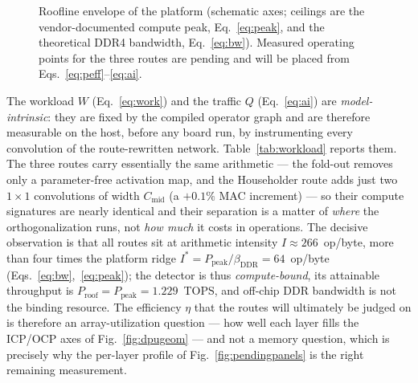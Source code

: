 \documentclass[onecolumn,journal]{IEEEtran}
\newcommand{\Ppeak}{P_{\mathrm{peak}}}
\begin{document}
\begin{figure}[t]
\centering
{}
\caption{Roofline envelope of the platform (schematic axes; ceilings are the
vendor-documented compute peak, Eq.~\eqref{eq:peak}, and the theoretical DDR4
bandwidth, Eq.~\eqref{eq:bw}). Measured operating points for the three routes are
pending and will be placed from Eqs.~\eqref{eq:peff}--\eqref{eq:ai}.}
\label{fig:roofline}
\end{figure}

The workload $W$ (Eq.~\eqref{eq:work}) and the traffic $Q$ (Eq.~\eqref{eq:ai}) are
\emph{model-intrinsic}: they are fixed by the compiled operator graph and are therefore
measurable on the host, before any board run, by instrumenting every convolution of the
route-rewritten network. Table~\ref{tab:workload} reports them. The three routes carry
essentially the same arithmetic --- the fold-out removes only a parameter-free
activation map, and the Householder route adds just two $1{\times}1$ convolutions of
width $C_{\mathrm{mid}}$ (a $+0.1\%$ MAC increment) --- so their compute signatures are
nearly identical and their separation is a matter of \emph{where} the orthogonalization
runs, not \emph{how much} it costs in operations. The decisive observation is that all
routes sit at arithmetic intensity $I\!\approx\!266$~op/byte, more than four times the
platform ridge $I^{\ast}=\Ppeak/\beta_{\mathrm{DDR}}=64$~op/byte
(Eqs.~\eqref{eq:bw},~\eqref{eq:peak}); the detector is thus \emph{compute-bound}, its
attainable throughput is $P_{\mathrm{roof}}=\Ppeak=1.229$~TOPS, and off-chip DDR
bandwidth is not the binding resource. The efficiency $\eta$ that the routes will
ultimately be judged on is therefore an array-utilization question --- how well each
layer fills the ICP/OCP axes of Fig.~\ref{fig:dpugeom} --- and not a memory question,
which is precisely why the per-layer profile of Fig.~\ref{fig:pendingpanels} is the
right remaining measurement.
\end{document}
